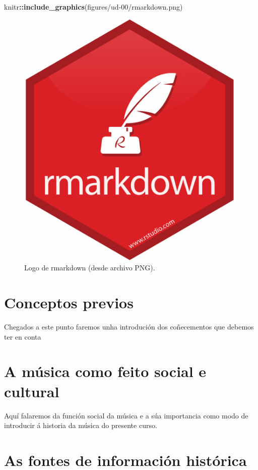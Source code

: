 \documentclass[a4paper, twoside]{templates/ociamthesis}
\newenvironment{Shaded}{\begin{snugshade}}{\end{snugshade}}
\newcommand{\KeywordTok}[1]{\textcolor[rgb]{0.13,0.29,0.53}{\textbf{#1}}}
\newcommand{\NormalTok}[1]{#1}
\newcommand{\OperatorTok}[1]{\textcolor[rgb]{0.81,0.36,0.00}{\textbf{#1}}}
\newcommand{\StringTok}[1]{\textcolor[rgb]{0.31,0.60,0.02}{#1}}
\renewenvironment{Shaded}
{
  \vspace{10pt}%
  \begin{snugshade}%
}{%
  \end{snugshade}%
  \vspace{8pt}%
}
\begin{document}
\begin{Shaded}
\begin{Highlighting}[]
\NormalTok{knitr}\OperatorTok{::}\KeywordTok{include\_graphics}\NormalTok{(}\StringTok{\textquotesingle{}figures/ud{-}00/rmarkdown.png\textquotesingle{}}\NormalTok{)}
\end{Highlighting}
\end{Shaded}

\begin{figure}

{\centering \includegraphics[width=0.3\linewidth]{figures/ud-00/rmarkdown} 

}

\caption{Logo de rmarkdown (desde archivo PNG).}\label{fig:rmarkdown}
\end{figure}

\hypertarget{conceptos-previos}{%
\section*{Conceptos previos}\label{conceptos-previos}}

Chegados a este punto faremos unha introdución dos coñecementos que debemos ter en conta

\hypertarget{a-muxfasica-como-feito-social-e-cultural}{%
\section*{A música como feito social e cultural}\label{a-muxfasica-como-feito-social-e-cultural}}

Aquí falaremos da función social da música e a súa importancia como modo de introducir á historia da música do presente curso.

\hypertarget{as-fontes-de-informaciuxf3n-histuxf3rica}{%
\section*{As fontes de información histórica}\label{as-fontes-de-informaciuxf3n-histuxf3rica}}
\end{document}

